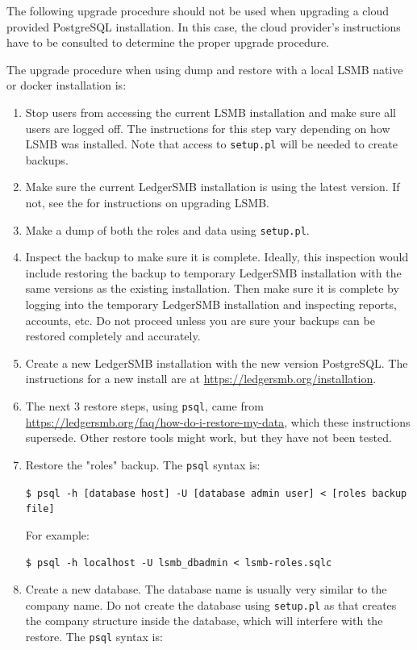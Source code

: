 The following upgrade procedure should not be used when upgrading a cloud provided PostgreSQL installation.
In this case, the cloud provider's instructions have to be consulted to determine the proper upgrade procedure.

The upgrade procedure when using dump and restore with a local LSMB native or docker installation  is:
\begin{enumerate}
    \item Stop users from accessing the current LSMB installation and make sure all users are logged off. 
        The instructions for this step vary depending on how LSMB was installed. 
        Note that access to \texttt{setup.pl} will be needed to create backups.
    \item Make sure the current LedgerSMB installation is using the latest version.  
        If not, see the  for instructions on upgrading LSMB.
    \item Make a dump of both the roles and data using \texttt{setup.pl}.
    \item Inspect the backup to make sure it is complete. 
        Ideally, this inspection would include restoring the backup to temporary LedgerSMB installation with the same versions as the existing installation.
        Then make sure it is complete by logging into the temporary LedgerSMB installation and inspecting reports, accounts, etc. 
        Do not proceed unless you are sure your backups can be restored completely and accurately.
    \item Create a new LedgerSMB installation with the new version PostgreSQL. 
        The instructions for a new install are at \url{https://ledgersmb.org/installation}.
    \item The next 3 restore steps, using \texttt{psql}, came from \url{https://ledgersmb.org/faq/how-do-i-restore-my-data}, which these instructions supersede. 
        Other restore tools might work, but they have not been tested.
    \item Restore the "roles" backup. The \texttt{psql} syntax is:
        
        \texttt{\$ psql -h [database host] -U [database admin user] < [roles backup file]}
        
        For example:
        
        \texttt{\$ psql -h localhost -U lsmb\_dbadmin < lsmb-roles.sqlc}
    \item Create a new database. 
        The database name is usually very similar to the company name. 
        Do not create the database using \texttt{setup.pl} as that creates the company structure inside the database, which will interfere with the restore.   The \texttt{psql} syntax is:


\end{enumerate}
